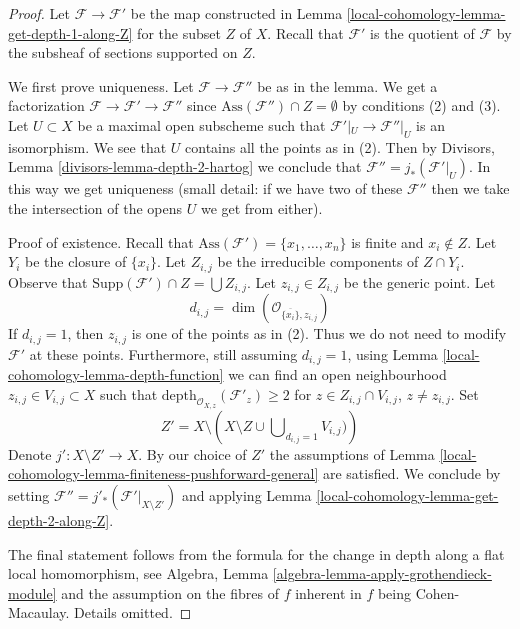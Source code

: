 \begin{proof}
Let $\mathcal{F} \to \mathcal{F}'$ be the map constructed in
Lemma \ref{local-cohomology-lemma-get-depth-1-along-Z} for the subset $Z$ of $X$.
Recall that $\mathcal{F}'$ is the quotient of $\mathcal{F}$
by the subsheaf of sections supported on $Z$.

\medskip\noindent
We first prove uniqueness. Let $\mathcal{F} \to \mathcal{F}''$
be as in the lemma. We get a factorization
$\mathcal{F} \to \mathcal{F}' \to \mathcal{F}''$
since $\text{Ass}(\mathcal{F}'') \cap Z = \emptyset$
by conditions (2) and (3). Let $U \subset X$ be a maximal open
subscheme such that $\mathcal{F}'|_U \to \mathcal{F}''|_U$
is an isomorphism. We see that $U$ contains all the points
as in (2). Then by Divisors, Lemma \ref{divisors-lemma-depth-2-hartog}
we conclude that $\mathcal{F}'' = j_*(\mathcal{F}'|_U)$.
In this way we get uniqueness (small detail: if we have two
of these $\mathcal{F}''$ then we take the intersection of the opens $U$
we get from either).

\medskip\noindent
Proof of existence. Recall that
$\text{Ass}(\mathcal{F}') = \{x_1, \ldots, x_n\}$
is finite and $x_i \not \in Z$.
Let $Y_i$ be the closure of $\{x_i\}$. Let
$Z_{i, j}$ be the irreducible components of $Z \cap Y_i$.
Observe that $\text{Supp}(\mathcal{F}') \cap Z = \bigcup Z_{i, j}$.
Let $z_{i, j} \in Z_{i, j}$ be the generic point.
Let
$$
d_{i, j} = \dim(\mathcal{O}_{\overline{\{x_i\}}, z_{i, j}})
$$
If $d_{i, j} = 1$, then $z_{i, j}$ is one of the points as in (2).
Thus we do not need to modify $\mathcal{F}'$ at these points.
Furthermore, still assuming $d_{i, j} = 1$, using
Lemma \ref{local-cohomology-lemma-depth-function}
we can find an open neighbourhood
$z_{i, j} \in V_{i, j} \subset X$ such that
$\text{depth}_{\mathcal{O}_{X, z}}(\mathcal{F}'_z) \geq 2$
for $z \in Z_{i, j} \cap V_{i, j}$, $z \not = z_{i, j}$.
Set
$$
Z' = X \setminus
\left(
X \setminus Z \cup \bigcup\nolimits_{d_{i, j} = 1} V_{i, j})
\right)
$$
Denote $j' : X \setminus Z' \to X$. By our choice of $Z'$
the assumptions of Lemma \ref{local-cohomology-lemma-finiteness-pushforward-general}
are satisfied.
We conclude by setting $\mathcal{F}'' = j'_*(\mathcal{F}'|_{X \setminus Z'})$
and applying Lemma \ref{local-cohomology-lemma-get-depth-2-along-Z}.

\medskip\noindent
The final statement follows from the formula for the change in
depth along a flat local homomorphism, see
Algebra, Lemma \ref{algebra-lemma-apply-grothendieck-module}
and the assumption on the fibres of $f$ inherent in $f$ being
Cohen-Macaulay. Details omitted.
\end{proof}

